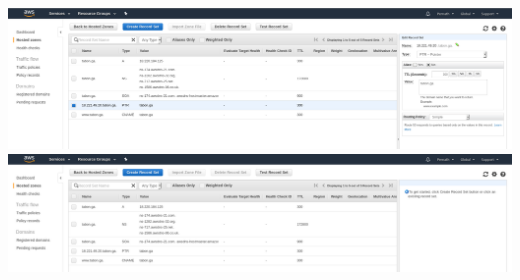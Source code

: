 \documentclass[9pt]{article}
\begin{document}
\includegraphics[width=\textwidth]{PTR}
\includegraphics[width=\textwidth]{record_set}
\end{document}
